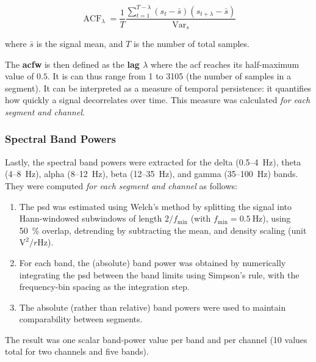 \begin{equation}
    \label{eq:acf}
    \operatorname{ACF}_\lambda =
    \frac{1}{T} \frac    {\sum_{t=1}^{T-\lambda}\left(s_t-\bar{s}\right)\left(s_{t+\lambda}-\bar{s}\right)}{\operatorname{Var}_s}
\end{equation}

where $\bar{s}$ is the signal mean, and $T$ is the number of total samples.

The \textbf{\gls{acfw}} is then defined as the \textbf{lag $\lambda$} where the \gls{acf} reaches its half-maximum value of $0.5$.
It is can thus range from 1 to 3105 (the number of samples in a segment).
It can be interpreted as a measure of temporal persistence: it quantifies how quickly a signal decorrelates over time.
This measure was calculated \textit{for each segment and channel}.

\subsubsection{Spectral Band Powers}
Lastly, the spectral band powers were extracted for the delta (0.5–\SI{4}{\Hz}), theta (4–\SI{8}{\Hz}), alpha (8–\SI{12}{\Hz}), beta (12–\SI{35}{\Hz}), and gamma (35–\SI{100}{\Hz}) bands.
They were computed \textit{for each segment and channel} as follows:

\begin{enumerate}
    \item The \gls{psd} was estimated using Welch’s method by splitting the signal into Hann-windowed subwindows of length $2/f_{\min}$ (with $f_{\min}=\SI{0.5}{\Hz}$), using \SI{50}{\percent} overlap, detrending by subtracting the mean, and density scaling (unit $\si{\volt}^2 / r\si{\Hz}$).
    \item For each band, the (absolute) band power was obtained by numerically integrating the \gls{psd} between the band limits using Simpson’s rule, with the frequency-bin spacing as the integration step.
    \item The absolute (rather than relative) band powers were used to maintain comparability between segments.
\end{enumerate}

The result was one scalar band-power value per band and per channel (10 values total for two channels and five bands).
